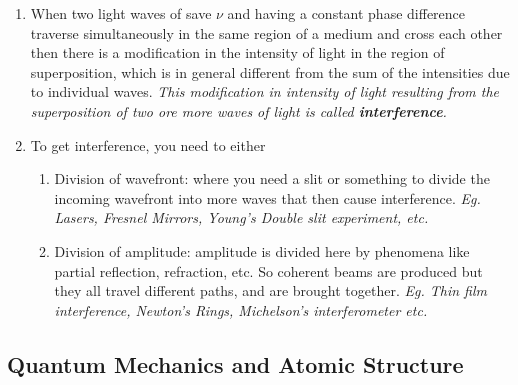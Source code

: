 \documentclass[12pt]{article}
\begin{document}
\begin{enumerate}

	\item When two light waves of save $\nu$ and having a constant phase difference traverse simultaneously in the same region of a medium and cross each other then there is a modification in the intensity of light in the region of superposition, which is in general different from the sum of the intensities due to individual waves. \textit{This modification in intensity of light resulting from the superposition of two ore more waves of light is called \textbf{interference}.}
	
	\item To get interference, you need to either 
	\begin{enumerate}
		\item Division of wavefront: where you need a slit or something to divide the incoming wavefront into more waves that then cause interference. \textit{Eg. Lasers, Fresnel Mirrors, Young's Double slit experiment, etc.}
		\item Division of amplitude: amplitude is divided here by phenomena like partial reflection, refraction, etc. So coherent beams are produced but they all travel different paths, and are brought together. 	\textit{Eg. Thin film interference, Newton's Rings, Michelson's interferometer etc. }
\end{enumerate}
	


\end{enumerate}

\subsection{Quantum Mechanics and Atomic Structure}
\end{document}
